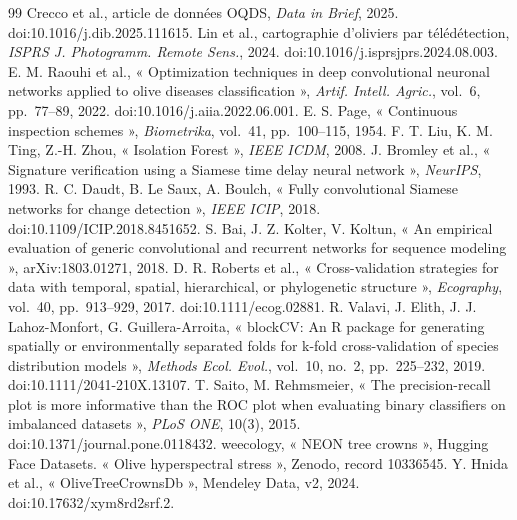 \documentclass[10pt,a4paper,twocolumn]{article}
\begin{document}
{\footnotesize
\begin{thebibliography}{99}
\setlength{\itemsep}{0pt}
 Crecco et al., article de données OQDS, \emph{Data in Brief}, 2025. doi:10.1016/j.dib.2025.111615.
 Lin et al., cartographie d'oliviers par télédétection, \emph{ISPRS J. Photogramm. Remote Sens.}, 2024. doi:10.1016/j.isprsjprs.2024.08.003.
 E. M. Raouhi et al., « Optimization techniques in deep convolutional neuronal networks applied to olive diseases classification », \emph{Artif. Intell. Agric.}, vol.~6, pp.~77--89, 2022. doi:10.1016/j.aiia.2022.06.001.
 E. S. Page, « Continuous inspection schemes », \emph{Biometrika}, vol.~41, pp.~100--115, 1954.
 F. T. Liu, K. M. Ting, Z.-H. Zhou, « Isolation Forest », \emph{IEEE ICDM}, 2008.
 J. Bromley et al., « Signature verification using a Siamese time delay neural network », \emph{NeurIPS}, 1993.
 R. C. Daudt, B. Le Saux, A. Boulch, « Fully convolutional Siamese networks for change detection », \emph{IEEE ICIP}, 2018. doi:10.1109/ICIP.2018.8451652.
 S. Bai, J. Z. Kolter, V. Koltun, « An empirical evaluation of generic convolutional and recurrent networks for sequence modeling », arXiv:1803.01271, 2018.
 D. R. Roberts et al., « Cross-validation strategies for data with temporal, spatial, hierarchical, or phylogenetic structure », \emph{Ecography}, vol.~40, pp.~913--929, 2017. doi:10.1111/ecog.02881.
 R. Valavi, J. Elith, J. J. Lahoz-Monfort, G. Guillera-Arroita, « blockCV: An R package for generating spatially or environmentally separated folds for k-fold cross-validation of species distribution models », \emph{Methods Ecol. Evol.}, vol.~10, no.~2, pp.~225--232, 2019. doi:10.1111/2041-210X.13107.
 T. Saito, M. Rehmsmeier, « The precision-recall plot is more informative than the ROC plot when evaluating binary classifiers on imbalanced datasets », \emph{PLoS ONE}, 10(3), 2015. doi:10.1371/journal.pone.0118432.
 weecology, « NEON tree crowns », Hugging Face Datasets.
 « Olive hyperspectral stress », Zenodo, record 10336545.
 Y. Hnida et al., « OliveTreeCrownsDb », Mendeley Data, v2, 2024. doi:10.17632/xym8rd2srf.2.
\end{thebibliography}
}
\end{document}
